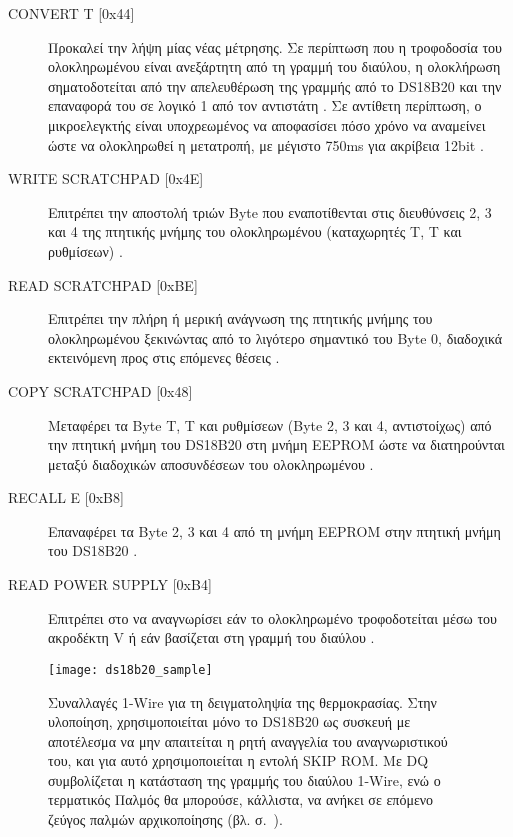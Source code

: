 \begin{description}
    \item[CONVERT T [0x44{]}] Προκαλεί την λήψη μίας νέας μέτρησης. Σε περίπτωση
    που η τροφοδοσία του ολοκληρωμένου είναι ανεξάρτητη από τη γραμμή του
    διαύλου, η ολοκλήρωση σηματοδοτείται από την απελευθέρωση της γραμμής από
    το DS18B20 και την επαναφορά του σε λογικό 1 από τον αντιστάτη 
    \parencite[11]{ds18b20}. Σε αντίθετη περίπτωση, ο μικροελεγκτής είναι
    υποχρεωμένος να αποφασίσει πόσο χρόνο να αναμείνει ώστε να ολοκληρωθεί η
    μετατροπή, με μέγιστο 750ms για ακρίβεια 12bit \parencite[8,11]{ds18b20}.

    \item[WRITE SCRATCHPAD [0x4E{]}] Επιτρέπει την αποστολή τριών Byte που
    εναποτίθενται στις διευθύνσεις 2, 3 και 4 της πτητικής μνήμης του
    ολοκληρωμένου (καταχωρητές T, T και ρυθμίσεων)
    \parencite[11]{ds18b20}.

    \item[READ SCRATCHPAD [0xBE{]}] Επιτρέπει την πλήρη ή μερική ανάγνωση της
    πτητικής μνήμης του ολοκληρωμένου ξεκινώντας από το λιγότερο σημαντικό
     του Byte 0, διαδοχικά εκτεινόμενη προς στις επόμενες θέσεις
    \parencite[11]{ds18b20}.

    \item[COPY SCRATCHPAD [0x48{]}] Μεταφέρει τα Byte T, T και
    ρυθμίσεων (Byte 2, 3 και 4, αντιστοίχως) από την πτητική μνήμη του DS18B20
    στη μνήμη EEPROM ώστε να διατηρούνται μεταξύ διαδοχικών αποσυνδέσεων του
    ολοκληρωμένου \parencite[12]{ds18b20}.

    \item[RECALL E\protect{} [0xB8{]}] Επαναφέρει τα Byte 2, 3 και 4 από
    τη μνήμη EEPROM στην πτητική μνήμη του DS18B20 \parencite[12]{ds18b20}.

    \item[READ POWER SUPPLY [0xB4{]}] Επιτρέπει στο  να αναγνωρίσει
    εάν το ολοκληρωμένο τροφοδοτείται μέσω του ακροδέκτη V ή εάν
    βασίζεται στη γραμμή του διαύλου \parencite[12]{ds18b20}.
\end{description}

\begin{figure}
    \caption{Συναλλαγές 1-Wire για τη δειγματοληψία της θερμοκρασίας.
    Στην υλοποίηση, χρησιμοποιείται μόνο το DS18B20 ως  συσκευή με
    αποτέλεσμα να μην απαιτείται η ρητή αναγγελία του αναγνωριστικού του, και
    για αυτό χρησιμοποιείται η εντολή SKIP ROM. Με DQ συμβολίζεται η κατάσταση
    της γραμμής του διαύλου 1-Wire, ενώ ο τερματικός Παλμός  θα
    μπορούσε, κάλλιστα, να ανήκει σε επόμενο ζεύγος παλμών αρχικοποίησης
    (βλ. σ.~\pageref{ssubsec:1-wire:initialisation}).
    \label{fig:ds18b20:sample}}
    \begin{center}
    \texttt{[image: ds18b20\_sample]}
    \end{center}
\end{figure}

